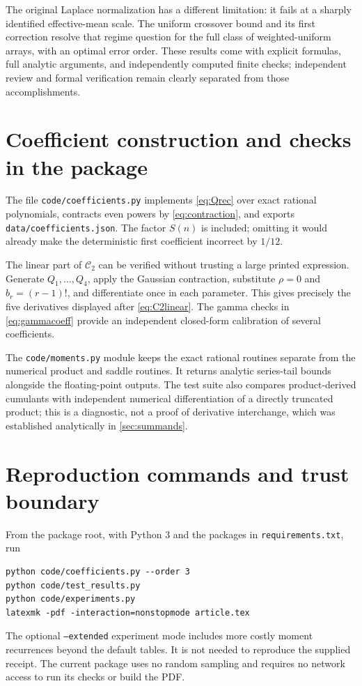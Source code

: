 \documentclass[11pt,a4paper]{article}
\numberwithin{equation}{section}
\theoremstyle{definition}\newtheorem{definition}[theorem]{Definition}
\theoremstyle{remark}\newtheorem{remark}[theorem]{Remark}
\newcommand{\Cj}{\mathscr C}
\begin{document}
The original Laplace normalization has a different limitation: it fails at a sharply identified effective-mean scale. The uniform crossover bound and its first correction resolve that regime question for the full class of weighted-uniform arrays, with an optimal error order. These results come with explicit formulas, full analytic arguments, and independently computed finite checks; independent review and formal verification remain clearly separated from those accomplishments.

\appendix
\section{Coefficient construction and checks in the package}
The file \texttt{code/coefficients.py} implements \eqref{eq:Qrec} over exact rational polynomials, contracts even powers by \eqref{eq:contraction}, and exports \texttt{data/coefficients.json}. The factor $S(n)$ is included; omitting it would already make the deterministic first coefficient incorrect by $1/12$.

The linear part of $\Cj_2$ can be verified without trusting a large printed expression. Generate $Q_1,\ldots,Q_4$, apply the Gaussian contraction, substitute $\rho=0$ and $b_r=(r-1)!$, and differentiate once in each parameter. This gives precisely the five derivatives displayed after \eqref{eq:C2linear}. The gamma checks in \eqref{eq:gammacoeff} provide an independent closed-form calibration of several coefficients.

The \texttt{code/moments.py} module keeps the exact rational routines separate from the numerical product and saddle routines. It returns analytic series-tail bounds alongside the floating-point outputs. The test suite also compares product-derived cumulants with independent numerical differentiation of a directly truncated product; this is a diagnostic, not a proof of derivative interchange, which was established analytically in \cref{sec:summands}.

\section{Reproduction commands and trust boundary}
From the package root, with Python 3 and the packages in \texttt{requirements.txt}, run
\begin{verbatim}
python code/coefficients.py --order 3
python code/test_results.py
python code/experiments.py
latexmk -pdf -interaction=nonstopmode article.tex
\end{verbatim}
The optional \texttt{--extended} experiment mode includes more costly moment recurrences beyond the default tables. It is not needed to reproduce the supplied receipt. The current package uses no random sampling and requires no network access to run its checks or build the PDF.
\end{document}
